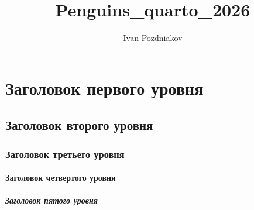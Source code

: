 \documentclass[
  letterpaper,
  DIV=11,
  numbers=noendperiod]{scrartcl}
\title{Penguins\_quarto\_2026}
\author{Ivan Pozdniakov}
\date{}
\let\oldparagraph\paragraph
\renewcommand{\paragraph}[1]{\oldparagraph{#1}\mbox{}}
\let\oldsubparagraph\subparagraph
\renewcommand{\subparagraph}[1]{\oldsubparagraph{#1}\mbox{}}
\begin{document}
\maketitle
\ifdefined\Shaded\renewenvironment{Shaded}{\begin{tcolorbox}[interior hidden, frame hidden, sharp corners, breakable, borderline west={3pt}{0pt}{shadecolor}, boxrule=0pt, enhanced]}{\end{tcolorbox}}\fi

\hypertarget{ux437ux430ux433ux43eux43bux43eux432ux43eux43a-ux43fux435ux440ux432ux43eux433ux43e-ux443ux440ux43eux432ux43dux44f}{%
\section{Заголовок первого
уровня}\label{ux437ux430ux433ux43eux43bux43eux432ux43eux43a-ux43fux435ux440ux432ux43eux433ux43e-ux443ux440ux43eux432ux43dux44f}}

\hypertarget{ux437ux430ux433ux43eux43bux43eux432ux43eux43a-ux432ux442ux43eux440ux43eux433ux43e-ux443ux440ux43eux432ux43dux44f}{%
\subsection{Заголовок второго
уровня}\label{ux437ux430ux433ux43eux43bux43eux432ux43eux43a-ux432ux442ux43eux440ux43eux433ux43e-ux443ux440ux43eux432ux43dux44f}}

\hypertarget{ux437ux430ux433ux43eux43bux43eux432ux43eux43a-ux442ux440ux435ux442ux44cux435ux433ux43e-ux443ux440ux43eux432ux43dux44f}{%
\subsubsection{Заголовок третьего
уровня}\label{ux437ux430ux433ux43eux43bux43eux432ux43eux43a-ux442ux440ux435ux442ux44cux435ux433ux43e-ux443ux440ux43eux432ux43dux44f}}

\hypertarget{ux437ux430ux433ux43eux43bux43eux432ux43eux43a-ux447ux435ux442ux432ux435ux440ux442ux43eux433ux43e-ux443ux440ux43eux432ux43dux44f}{%
\paragraph{Заголовок четвертого
уровня}\label{ux437ux430ux433ux43eux43bux43eux432ux43eux43a-ux447ux435ux442ux432ux435ux440ux442ux43eux433ux43e-ux443ux440ux43eux432ux43dux44f}}

\hypertarget{ux437ux430ux433ux43eux43bux43eux432ux43eux43a-ux43fux44fux442ux43eux433ux43e-ux443ux440ux43eux432ux43dux44f}{%
\subparagraph{Заголовок пятого
уровня}\label{ux437ux430ux433ux43eux43bux43eux432ux43eux43a-ux43fux44fux442ux43eux433ux43e-ux443ux440ux43eux432ux43dux44f}}
\end{document}
